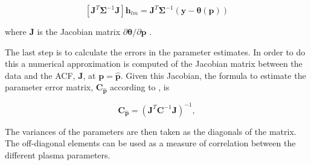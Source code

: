 \begin{equation}
\left[ \mathbf{J}^T\bm{\Sigma}^{-1}\mathbf{J}\right]\mathbf{h}_{lm} =\mathbf{J}^T\bm{\Sigma}^{-1}(\mathbf{y}-\bm{\theta}(\mathbf{p}))
\label{hlm}
\end{equation}

\noindent where $\mathbf{J}$ is the Jacobian matrix $\partial \bm{\theta}/\partial \mathbf{p}$ \citep{levenberg1944,marquardt:1963}. 

The last step is to calculate the errors in the parameter estimates. In order to do this a numerical approximation is computed of the Jacobian matrix between the data and the ACF, $\mathbf{J}$, at $\mathbf{p}=\mathbf{\hat{p}}$. Given this Jacobian, the formula to estimate the parameter error matrix, $\mathbf{C}_{\mathbf{\hat{p}}}$ according to \citet{Hysell:2000cq}, is

\begin{equation}
\label{eqn:jacinv}
\mathbf{C}_{\mathbf{\hat{p}}}=(\mathbf{J}^T \mathbf{C}^{-1}\mathbf{J})^{-1},
\end{equation}

\noindent  The variances of the parameters are then taken as the diagonals of the matrix. The off-diagonal elements can be used as a measure of correlation between the different plasma parameters.

%
%




